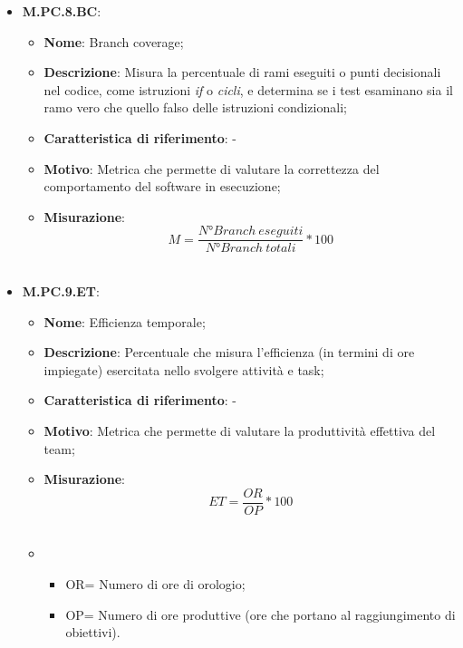 \documentclass[10pt, a4paper]{article}
\begin{document}
\begin{itemize}
    \item \textbf{M.PC.8.BC}:
    \begin{itemize}
        \item \textbf{Nome}: Branch coverage;
        \item \textbf{Descrizione}: Misura la percentuale di rami eseguiti o punti decisionali nel codice, come istruzioni \textit{if} o \textit{cicli}, e determina se i test esaminano sia il ramo vero che quello falso delle istruzioni condizionali;
        \item \textbf{Caratteristica di riferimento}: -
        \item \textbf{Motivo}: Metrica che permette di valutare la correttezza del comportamento del software in esecuzione;
        \item \textbf{Misurazione}:  \[M=\frac{N° Branch \ eseguiti}{N° Branch\ totali} * 100 \] \\
    \end{itemize}


    \item \textbf{M.PC.9.ET}:
    \begin{itemize}
        \item \textbf{Nome}: Efficienza temporale;
        \item \textbf{Descrizione}: Percentuale che misura l'efficienza (in termini di ore impiegate) esercitata nello svolgere attività e task;
        \item \textbf{Caratteristica di riferimento}: -
        \item \textbf{Motivo}: Metrica che permette di valutare la produttività effettiva del team;
        \item \textbf{Misurazione}:  \[ET=\frac{OR}{OP} * 100 \] \\
        \item  \begin{itemize}
            \item OR= Numero di ore di orologio;
            \item OP= Numero di ore produttive (ore che portano al raggiungimento di obiettivi).\\
            \end{itemize}
    \end{itemize}
    
\end{itemize}
\end{document}
